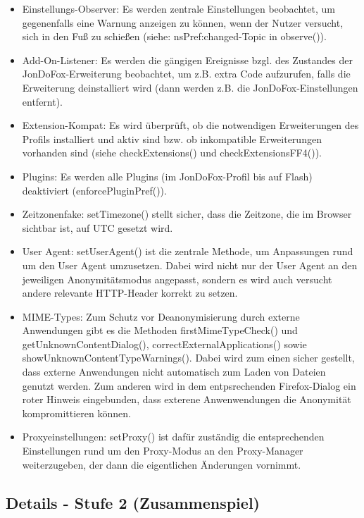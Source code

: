 \documentclass[a4paper,10pt]{scrartcl}
\begin{document}
\begin{itemize}
\begin{itemize}
\begin{itemize}
              \item Einstellungs-Observer: Es werden zentrale Einstellungen
                beobachtet, um gegenenfalls eine Warnung anzeigen zu können,
                wenn der Nutzer versucht, sich in den Fuß zu schießen (siehe:
                nsPref:changed-Topic in observe()).
              \item Add-On-Listener: Es werden die gängigen Ereignisse bzgl. des
                Zustandes der JonDoFox-Erweiterung beobachtet, um z.B. extra
                Code aufzurufen, falls die Erweiterung deinstalliert wird (dann
                werden z.B. die JonDoFox-Einstellungen entfernt).
              \item Extension-Kompat: Es wird überprüft, ob die notwendigen
                Erweiterungen des Profils installiert und aktiv sind bzw. ob
                inkompatible Erweiterungen vorhanden sind (siehe
                checkExtensions() und checkExtensionsFF4()).
              \item Plugins: Es werden alle Plugins (im JonDoFox-Profil bis auf
                Flash) deaktiviert (enforcePluginPref()).
              \item Zeitzonenfake: setTimezone() stellt sicher, dass die
                Zeitzone, die im Browser sichtbar ist, auf UTC gesetzt wird.
              \item User Agent: setUserAgent() ist die zentrale Methode, um
                Anpassungen rund um den User Agent umzusetzen. Dabei wird nicht
                nur der User Agent an den jeweiligen Anonymitätsmodus angepasst,
                sondern es wird auch versucht andere relevante HTTP-Header
                korrekt zu setzen.
              \item MIME-Types: Zum Schutz vor Deanonymisierung durch externe
                Anwendungen gibt es die Methoden firstMimeTypeCheck() und
                getUnknownContentDialog(), correctExternalApplications() sowie
                showUnknownContentTypeWarnings(). Dabei wird zum einen sicher
                gestellt, dass externe Anwendungen nicht automatisch zum Laden
                von Dateien genutzt werden. Zum anderen wird in dem
                entpsrechenden Firefox-Dialog ein roter Hinweis eingebunden,
                dass exterene Anwenwendungen die Anonymität kompromittieren
                können.
              \item Proxyeinstellungen: setProxy() ist dafür zuständig die
                entsprechenden Einstellungen rund um den Proxy-Modus an den
                Proxy-Manager weiterzugeben, der dann die eigentlichen
                Änderungen vornimmt.
            \end{itemize}
        \end{itemize}
      \end{itemize}
  \subsection{Details - Stufe 2 (Zusammenspiel)}
\end{document}
